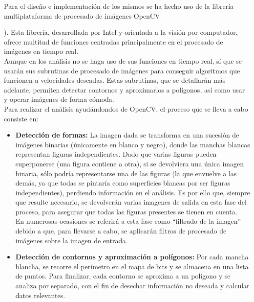 Para el diseño e implementación de los mismos se ha hecho uso de la librería multiplataforma de procesado de imágenes OpenCV {\cite{opencvDoc}). Esta librería, desarrollada por Intel y orientada a la visión por computador, ofrece multitud de funciones centradas principalmente en el procesado de imágenes en tiempo real.\\

Aunque en los análisis no se haga uso de sus funciones en tiempo real, sí que se usarán sus subrutinas de procesado de imágenes para conseguir algoritmos que funcionen a velocidades deseadas. Estas subrutinas, que se detallarán más adelante, permiten detectar contornos y aproximarlos a polígonos, así como usar y operar imágenes de forma cómoda.\\

Para realizar el análisis ayudándondos de OpenCV, el proceso que se lleva a cabo consiste en:

\begin{itemize}

	\item \textbf{Detección de formas:} La imagen dada se transforma en una sucesión de imágenes binarias (únicamente en blanco y negro), donde las manchas blancas representan figuras independientes. Dado que varias figuras pueden superponerse (una figura contiene a otra), si se devolviera una única imagen binaria, sólo podría representarse una de las figuras (la que envuelve a las demás, ya que todas se pintaría como superficies blancas por ser figuras independientes), perdiendo información en el análisis. Es por ello que, siempre que resulte necesario, se devolverán varias imagenes de salida en esta fase del proceso, para asegurar que todas las figuras presentes se tienen en cuenta.\\
	
	En numerosas ocasiones se referirá a esta fase como ``filtrado de la imagen'' debido a que, para llevarse a cabo, se aplicarán filtros de procesado de imágenes sobre la imagen de entrada.
	
	\item\textbf{Detección de contornos y aproximación a polígonos:} Por cada mancha blancha, se recorre el perímetro en el mapa de bits y se almacena en una lista de puntos. Para finalizar, cada contorno se aproxima a un polígono y se analiza por separado, con el fin de desechar información no deseada y calcular datos relevantes. 
	
\end{itemize}

}
